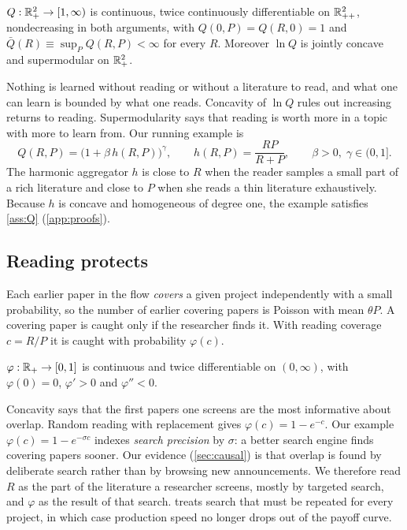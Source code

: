 \begin{assumption}[Learning]\label{ass:Q}
$Q:\mathbb{R}_+^2\to[1,\infty)$ is continuous, twice continuously differentiable on
$\mathbb{R}_{++}^2$, nondecreasing in both arguments, with $Q(0,P)=Q(R,0)=1$ and
$\bar Q(R)\equiv\sup_P Q(R,P)<\infty$ for every $R$. Moreover $\ln Q$ is
jointly concave and supermodular on $\mathbb{R}_+^2$.
\end{assumption}

Nothing is learned without reading or without a literature to read, and what
one can learn is bounded by what one reads. Concavity of $\ln Q$ rules out
increasing returns to reading. Supermodularity says that reading is worth
more in a topic with more to learn from. Our running example is
\begin{equation}\label{eq:Qexample}
Q(R,P) = \big(1+\beta\,h(R,P)\big)^{\gamma},\qquad h(R,P)=\frac{RP}{R+P},\qquad \beta>0,\;\gamma\in(0,1].
\end{equation}
The harmonic aggregator $h$ is close to $R$ when the reader samples a small
part of a rich literature and close to $P$ when she reads a thin literature
exhaustively. Because $h$ is concave and homogeneous of degree one, the
example satisfies \cref{ass:Q} (\cref{app:proofs}).

\subsection{Reading protects}

Each earlier paper in the flow \emph{covers} a given project independently
with a small probability, so the number of earlier covering papers is Poisson
with mean $\theta P$. A covering paper is caught only if the researcher finds
it. With reading coverage $c=R/P$ it is caught with probability $\varphi(c)$.

\begin{assumption}[Detection]\label{ass:phi}
$\varphi:\mathbb{R}_+\to[0,1]$ is continuous and twice differentiable on $(0,\infty)$,
with $\varphi(0)=0$, $\varphi'>0$ and $\varphi''<0$.
\end{assumption}

Concavity says that the first papers one screens are the most informative
about overlap. Random reading with replacement gives $\varphi(c)=1-e^{-c}$. Our
example $\varphi(c)=1-e^{-\sigma c}$ indexes \emph{search precision} by
$\sigma$: a better search engine finds covering papers sooner. Our evidence
(\cref{sec:causal}) is that overlap is found by deliberate search rather than
by browsing new announcements. We therefore read $R$ as the part of the
literature a researcher screens, mostly by targeted search, and $\varphi$ as
the result of that search.  treats search that must be
repeated for every project, in which case production speed no longer drops
out of the payoff curve.

